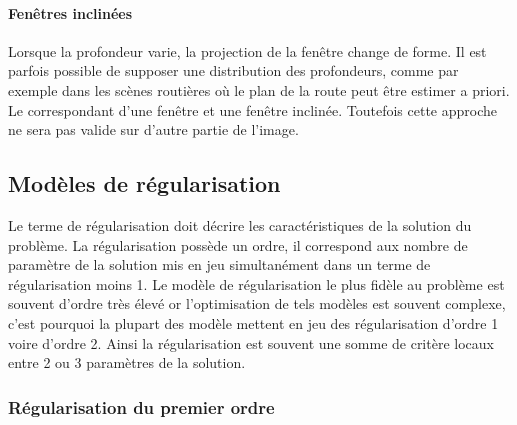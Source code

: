 \documentclass[../main/These_Mathias_Paget.tex]{subfiles}
\begin{document}
\paragraph*{Fenêtres inclinées}
Lorsque la profondeur varie, la projection de la fenêtre change de forme. Il est parfois possible de supposer une distribution des profondeurs, comme par exemple dans les scènes routières où le plan de la route peut être estimer a priori. Le correspondant d'une fenêtre et une fenêtre inclinée. Toutefois cette approche ne sera pas valide sur d'autre partie de l'image.

\subsection{Modèles de régularisation}

Le terme de régularisation doit décrire les caractéristiques de la solution du problème. La régularisation possède un ordre, il correspond aux nombre de paramètre de la solution mis en jeu simultanément dans un terme de régularisation moins 1. Le modèle de régularisation le plus fidèle au problème est souvent d'ordre très élevé or l'optimisation de tels modèles est souvent complexe, c'est pourquoi la plupart des modèle mettent en jeu des régularisation d'ordre 1 voire d'ordre 2. Ainsi la régularisation est souvent une somme de critère locaux entre 2 ou 3 paramètres de la solution.

\subsubsection{Régularisation du premier ordre}
\end{document}
